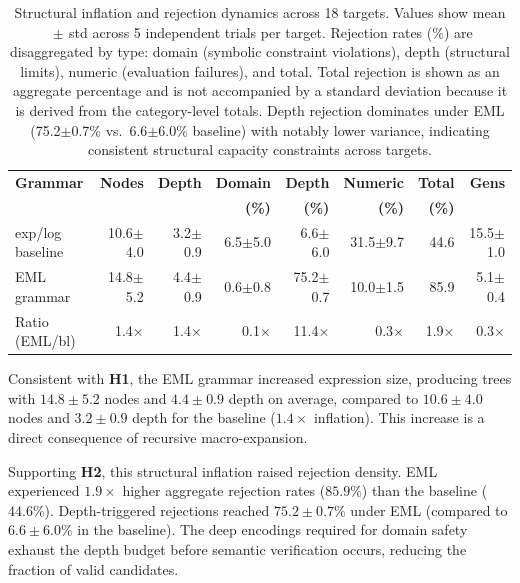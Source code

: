 \documentclass[runningheads]{llncs}
\begin{document}
\begin{table}[t]
\centering
\scriptsize
\setlength{\tabcolsep}{2pt}
\caption{Structural inflation and rejection dynamics across 18 targets. Values show mean$\,\pm\,$std across 5 independent trials per target. Rejection rates (\%) are disaggregated by type: domain (symbolic constraint violations), depth (structural limits), numeric (evaluation failures), and total. Total rejection is shown as an aggregate percentage and is not accompanied by a standard deviation because it is derived from the category-level totals. Depth rejection dominates under EML (75.2$\pm$0.7\% vs.~6.6$\pm$6.0\% baseline) with notably lower variance, indicating consistent structural capacity constraints across targets.}
\label{tab:inflation_summary}
\begin{tabular}{@{}lrrrrrrr@{}}
\toprule
\textbf{Grammar} & \textbf{Nodes} & \textbf{Depth} & \textbf{Domain} & \textbf{Depth} & \textbf{Numeric} & \textbf{Total} & \textbf{Gens} \\
 & & & \textbf{(\%)} & \textbf{(\%)} & \textbf{(\%)} & \textbf{(\%)} & \\
\midrule
exp/log baseline & 10.6$\pm$4.0 & 3.2$\pm$0.9 & 6.5$\pm$5.0 & 6.6$\pm$6.0 & 31.5$\pm$9.7 & 44.6 & 15.5$\pm$1.0 \\
EML grammar & 14.8$\pm$5.2 & 4.4$\pm$0.9 & 0.6$\pm$0.8 & 75.2$\pm$0.7 & 10.0$\pm$1.5 & 85.9 & 5.1$\pm$0.4 \\
\midrule
Ratio (EML/bl) & 1.4$\times$ & 1.4$\times$ & 0.1$\times$ & 11.4$\times$ & 0.3$\times$ & 1.9$\times$ & 0.3$\times$ \\
\bottomrule
\end{tabular}
\end{table}

Consistent with \textbf{H1}, the EML grammar increased expression size, producing trees with $14.8\pm5.2$ nodes and $4.4\pm0.9$ depth on average, compared to $10.6\pm4.0$ nodes and $3.2\pm0.9$ depth for the baseline ($1.4\times$ inflation). This increase is a direct consequence of recursive macro-expansion.

Supporting \textbf{H2}, this structural inflation raised rejection density. EML experienced $1.9\times$ higher aggregate rejection rates ($85.9\%$) than the baseline ($44.6\%$). Depth-triggered rejections reached $75.2\pm0.7\%$ under EML (compared to $6.6\pm6.0\%$ in the baseline). The deep encodings required for domain safety exhaust the depth budget before semantic verification occurs, reducing the fraction of valid candidates.
\end{document}
